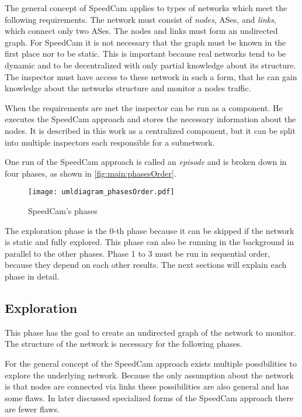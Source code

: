 \documentclass[thesis.tex]{subfiles}
\begin{document}
The general concept of SpeedCam applies to types of networks which meet the following requirements. The network must consist of \textit{nodes}, ASes, and \textit{links}, which connect only two ASes. The nodes and links must form an undirected graph. For SpeedCam it is not necessary that the graph must be known in the first place nor to be static. This is important because real networks tend to be dynamic and to be decentralized with only partial knowledge about its structure. The inspector must have access to these network in such a form, that he can gain knowledge about the networks structure and monitor a nodes traffic.

When the requirements are met the inspector can be run as a component. He executes the SpeedCam approach and stores the necessary information about the nodes. It is described in this work as a centralized component, but it can be split into multiple inspectors each responsible for a subnetwork. 

One run of the SpeedCam approach is called an \textit{episode} and is broken down in four phases, as shown in \autoref{fig:main:phasesOrder}.

\begin{figure}[!h]
	\centering
	\texttt{[image: umldiagram\_phasesOrder.pdf]}
	\caption{SpeedCam's phases}
	\label{fig:main:phasesOrder}
\end{figure}


The exploration phase is the 0-th phase because it can be skipped if the network is static and fully explored. This phase can also be running in the background in parallel to the other phases. Phase 1 to 3 must be run in sequential order, because they depend on each other results. The next sections will explain each phase in detail.

\subsection{Exploration} \label{sec:main:explorationphase}
This phase has the goal to create an undirected graph of the network to monitor. The structure of the network is necessary for the following phases. 

For the general concept of the SpeedCam approach exists multiple possibilities to explore the underlying network. Because the only assumption about the network is that nodes are connected via links these possibilities are also general and has some flaws. In later discussed specialized forms of the SpeedCam approach there are fewer flaws.
\end{document}
